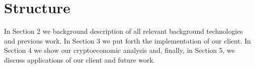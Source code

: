 \section{Structure}

In Section 2 we background description of all relevant background
technologies and previous work. In Section 3 we put forth the implementation of
our client. In Section 4 we show our cryptoeconomic analysis and, finally, in
Section 5, we discuss applications of our client and future work.
